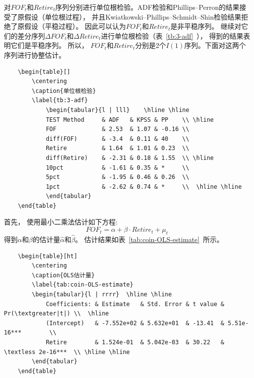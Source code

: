 对${FOF_t}$和${Retire_t}$序列分别进行单位根检验。ADF检验和Phillips–Perron的结果接受了原假设（单位根过程）， 并且Kwiatkowski–Phillips–Schmidt–Shin检验结果拒绝了原假设（平稳过程）。 因此可以认为${FOF_t}$和${Retire_t}$是非平稳序列。
继续对它们的差分序列${\Delta FOF_t}$和${\Delta Retire_t}$进行单位根检验（表~\ref{tb:3-adf}~）， 得到的结果表明它们是平稳序列。 所以， ${FOF_t}$和${Retire_t}$分别是2个$I(1)$序列。下面对这两个序列进行协整估计。

\begin{lstlisting}
    \begin{table}[]
        \centering
        \caption{单位根检验}
        \label{tb:3-adf}
            \begin{tabular}{l | lll}    \hline \hline
            TEST Method     & ADF   & KPSS & PP    \\ \hline
            FOF             & 2.53  & 1.07 & -0.16 \\
            diff(FOF)       & -3.4  & 0.11 & 40    \\
            Retire          & 1.64  & 1.01 & 0.23  \\
            diff(Retire)    & -2.31 & 0.18 & 1.55  \\ \hline
            10pct           & -1.61 & 0.35 & *     \\
            5pct            & -1.95 & 0.46 & 0.26  \\
            1pct            & -2.62 & 0.74 & *     \\  \hline \hline
            \end{tabular}
    \end{table}
\end{lstlisting}

首先， 使用最小二乘法估计如下方程:
$$FOF_t = \alpha + \beta \cdot Retire_t + \mu_t$$
得到$\alpha$和$\beta$的估计量$\hat{\alpha}$和$\hat{\beta}$。 估计结果如表~\ref{tab:coin-OLS-estimate}~所示。

\begin{lstlisting}
    \begin{table}[ht]
        \centering
        \caption{OLS估计量}
        \label{tab:coin-OLS-estimate}
        \begin{tabular}{l | rrrr}  \hline \hline
            Coefficients: & Estimate   & Std. Error & t value & Pr(\textgreater|t|) \\  \hline
            (Intercept)   & -7.552e+02 & 5.632e+01  & -13.41  & 5.51e-16***        \\
            Retire        & 1.524e-01  & 5.042e-03  & 30.22   & \textless 2e-16***  \\ \hline \hline
        \end{tabular}
    \end{table}
\end{lstlisting}


